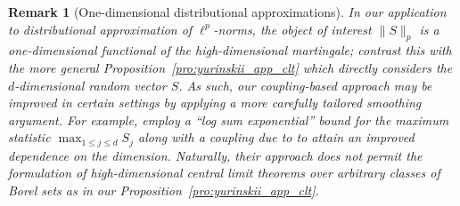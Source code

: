 \documentclass[11pt,lof]{puthesis}
\theoremstyle{break}
\newtheorem{remark}{Remark}[section]
\theoremstyle{proof}
\begin{document}
\begin{remark}[One-dimensional distributional approximations]
  In our application to distributional approximation of $\ell^p$-norms,
  the object of interest $\|S\|_p$ is a
  one-dimensional functional of the high-dimensional martingale;
  contrast this with the more general Proposition~\ref{pro:yurinskii_app_clt}
  which directly considers the $d$-dimensional random vector $S$.
  As such, our coupling-based approach may be improved in certain settings
  by applying a more carefully tailored smoothing argument.
  For example, \citet{belloni2018high}
  employ a ``log sum exponential'' bound
  \citep[see also][]{chernozhukov2013gaussian}
  for the maximum statistic
  $\max_{1 \leq j \leq d} S_j$
  along with a coupling due to \citet{chernozhukov2014gaussian} to attain
  an improved dependence on the dimension.
  Naturally, their approach does not permit the formulation of
  high-dimensional central limit theorems over arbitrary classes of
  Borel sets as in our Proposition~\ref{pro:yurinskii_app_clt}.
\end{remark}

\clearpage
{}


\end{document}
